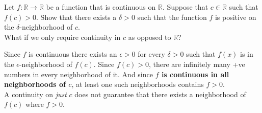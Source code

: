 \documentclass[boxes, qed]{homework}
\begin{document}
\begin{problem}Let $f: \mathbb{R}\to \mathbb{R}$ be a function that is continuous on $\mathbb{R}$. 
  Suppose that $c \in \mathbb{R}$ such that $f(c) > 0$. Show that there exists a $\delta > 0$ 
  such that the function $f$ is positive on the $\delta$-neighborhood of $c$.\\
  What if we only require continuity in $c$ as opposed to $\mathbb{R}$?
\end{problem}
\begin{solution}Since $f$ is continuous there exists an $\epsilon>0$ for every 
  $\delta>0$ such that $f(x)$ is in the $\epsilon$-neighborhood of $f(c)$. 
  Since $f(c)>0$, there are infinitely many +ve numbers in every neighborhood of it.
  And since \textbf{$f$ is continuous in all neighborhoods of $c$}, at least one such 
  neighborhoods contains $f>0$.\\

  A continuity on \textit{just} $c$ does not guarantee that there exists a neighborhood
  of $f(c)$ where $f>0$.
\end{solution}
\end{document}
